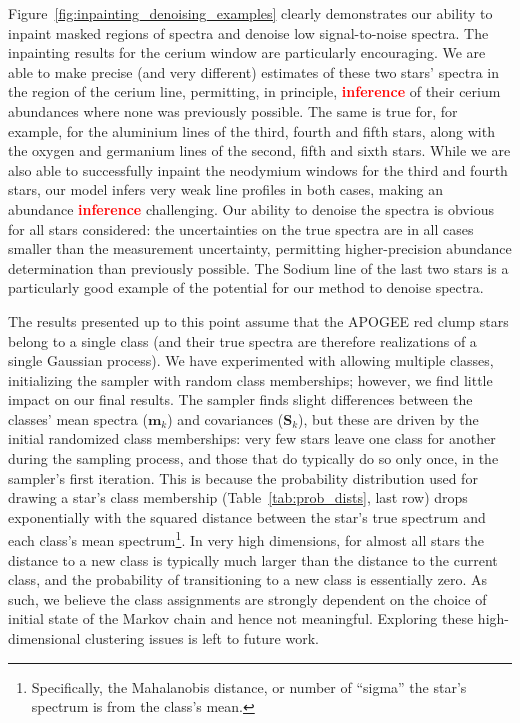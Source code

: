 \documentclass[a4paper,fleqn,usenatbib]{mnras}
\newcommand{\specmean}{{\bm m}}
\newcommand{\speccov}{{\bm S}}
\newcommand\edit[1]{\textcolor{red}{\textbf{#1}}}
\begin{document}
Figure~\ref{fig:inpainting_denoising_examples} clearly demonstrates our ability to inpaint masked regions of spectra and denoise low signal-to-noise spectra. The inpainting results for the cerium window are particularly encouraging. We are able to make precise (and very different) estimates of these two stars' spectra in the region of the cerium line, permitting, in principle, \edit{inference} of their cerium abundances where none was previously possible. The same is true for, for example, for the aluminium lines of the third, fourth and fifth stars, along with the oxygen and germanium lines of the second, fifth and sixth stars. While we are also able to successfully inpaint the neodymium windows for the third and fourth stars, our model infers very weak line profiles in both cases, making an abundance \edit{inference} challenging. Our ability to denoise the spectra is obvious for all stars considered: the uncertainties on the true spectra are in all cases smaller than the measurement uncertainty, permitting higher-precision abundance determination than previously possible. The Sodium line of the last two stars is a particularly good example of the potential for our method to denoise spectra.

The results presented up to this point assume that the APOGEE red clump stars belong to a single class (and their true spectra are therefore realizations of a single Gaussian process). We have experimented with allowing multiple classes, initializing the sampler with random class memberships; however, we find little impact on our final results. The sampler finds slight differences between the classes' mean spectra ($\specmean_k$) and covariances ($\speccov_k$), but these are driven by the initial randomized class memberships: very few stars leave one class for another during the sampling process, and those that do typically do so only once, in the sampler's first iteration. This is because the probability distribution used for drawing a star's class membership (Table~\ref{tab:prob_dists}, last row) drops exponentially with the squared distance between the star's true spectrum and each class's mean spectrum\footnote{Specifically, the Mahalanobis distance, or number of ``sigma'' the star's spectrum is from the class's mean.}. In very high dimensions, for almost all stars the distance to a new class is typically much larger than the distance to the current class, and the probability of transitioning to a new class is essentially zero. As such, we believe the class assignments are strongly dependent on the choice of initial state of the Markov chain and hence not meaningful. Exploring these high-dimensional clustering issues is left to future work. 
\end{document}
